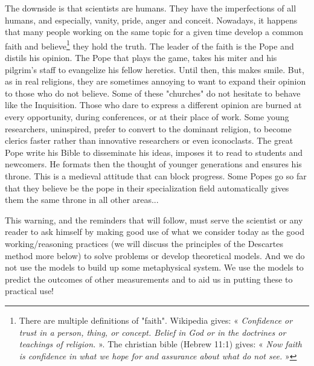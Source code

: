 	The downside is that scientists are humans. They have the imperfections of all humans, and especially, vanity, pride, anger and conceit. Nowadays, it happens that many people working on the same topic for a given time develop a common faith and believe\footnote{There are multiple definitions of "faith". Wikipedia gives: « \textit{Confidence or trust in a person, thing, or concept. Belief in God or in the doctrines or teachings of religion.} ». The christian bible (Hebrew 11:1) gives: « \textit{Now faith is confidence in what we hope for and assurance about what do not see.} »} they hold the truth. The leader of the faith is the Pope and distils his opinion. The Pope that plays the game, takes his miter and his pilgrim's staff to evangelize his fellow heretics. Until then, this makes smile. But, as in real religions, they are sometimes annoying to want to expand their opinion to those who do not believe. Some of these "churches" do not hesitate to behave like the Inquisition. Those who dare to express a different opinion are burned at every opportunity, during conferences, or at their place of work. Some young researchers, uninspired, prefer to convert to the dominant religion, to become clerics faster rather than innovative researchers or even iconoclasts. The great Pope write his Bible to disseminate his ideas, imposes it to read to students and newcomers. He formats then the thought of younger generations and ensures his throne. This is a medieval attitude that can block progress. Some Popes go so far that they believe be the pope in their specialization field automatically gives them the same throne in all other areas...

	This warning, and the reminders that will follow, must serve the scientist or any reader to ask himself by making good use of what we consider today as the good working/reasoning practices (we will discuss the principles of the Descartes method more below) to solve problems or develop theoretical models. And we do not use the models to build up some metaphysical system. We use the models to predict the outcomes of other measurements and to aid us in putting these to practical use!

